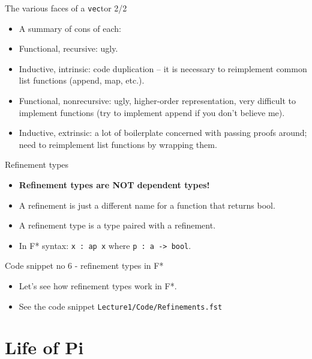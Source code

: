 \documentclass{beamer}
\newcommand{\m}[1]{\texttt{#1}}
\begin{document}
\begin{frame}{The various faces of a \m{vec}tor 2/2}
\begin{itemize}
	\item A summary of cons of each:
	\item Functional, recursive: ugly.
	\item Inductive, intrinsic: code duplication -- it is necessary to reimplement common list functions (append, map, etc.).
    \item Functional, nonrecursive: ugly, higher-order representation, very difficult to implement functions (try to implement append if you don't believe me).
    \item Inductive, extrinsic: a lot of boilerplate concerned with passing proofs around; need to reimplement list functions by wrapping them.
\end{itemize}
\end{frame}

\begin{frame}{Refinement types}
\begin{itemize}
    \item \textbf{Refinement types are NOT dependent types!}
    \item A refinement is just a different name for a function that returns bool.
    \item A refinement type is a type paired with a refinement.
    \item In F* syntax: \m{x : a{p x}} where \m{p : a -> bool}.
\end{itemize}
\end{frame}

\begin{frame}{Code snippet no 6 - refinement types in F*}
\begin{itemize}
	\item Let's see how refinement types work in F*.
	\item See the code snippet \m{Lecture1/Code/Refinements.fst}
\end{itemize}
\end{frame}

\section{Life of Pi}
\end{document}
